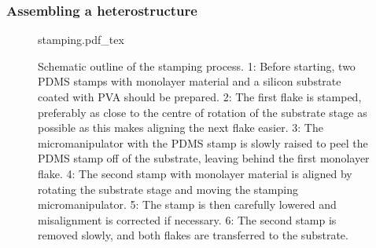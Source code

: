 \subsubsection{Assembling a heterostructure}
\begin{figure}[h]
    \centering
    \def\svgwidth{1\linewidth}
    {stamping.pdf_tex}
    \caption{Schematic outline of the stamping process. 1: Before starting, two PDMS stamps with monolayer material and a silicon substrate coated with PVA should be prepared. 2: The first flake is stamped, preferably as close to the centre of rotation of the substrate stage as possible as this makes aligning the next flake easier. 3: The micromanipulator with the PDMS stamp is slowly raised to peel the PDMS stamp off of the substrate, leaving behind the first monolayer flake. 4: The second stamp with monolayer material is aligned by rotating the substrate stage and moving the stamping micromanipulator. 5: The stamp is then carefully lowered and misalignment is corrected if necessary. 6: The second stamp is removed slowly, and both flakes are transferred to the substrate.}
    \label{fig:stamping_process}
\end{figure}

